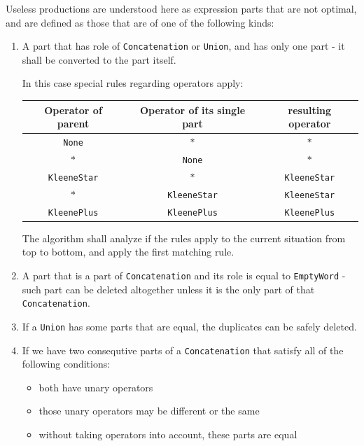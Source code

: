 \documentclass{article}
\begin{document}
Useless productions are understood here as expression parts that are not optimal, and are defined as
those that are of one of the following kinds:
\begin{enumerate}

  \item A part that has role of \verb|Concatenation| or \verb|Union|, and has only one part - it
  shall be converted to the part itself.

  In this case special rules regarding operators apply:

  \noindent
  \begin{tabular}{c|c|c}
  Operator of parent & Operator of its single part & resulting operator \\ \hline
  \verb|None| & $*$ & $*$ \\
  $*$ & \verb|None| & $*$ \\
  \verb|KleeneStar| & $*$ & \verb|KleeneStar| \\
  $*$ & \verb|KleeneStar| & \verb|KleeneStar| \\
  \verb|KleenePlus| & \verb|KleenePlus| & \verb|KleenePlus| \\
  \end{tabular}

  \vspace{10pt} The algorithm shall analyze if the rules apply to the current situation from top to
  bottom, and apply the first matching rule.

  \item A part that is a part of \verb|Concatenation| and its role is equal to \verb|EmptyWord| -
  such part can be deleted altogether unless it is the only part of that \verb|Concatenation|.

  \item If a \verb|Union| has some parts that are equal, the duplicates can be safely deleted.

  \item If we have two consequtive parts of a \verb|Concatenation| that satisfy all of the following conditions:

  \begin{itemize}

    \item both have unary operators

    \item those unary operators may be different or the same

    \item without taking operators into account, these parts are equal


\end{itemize}
\end{enumerate}
\end{document}
